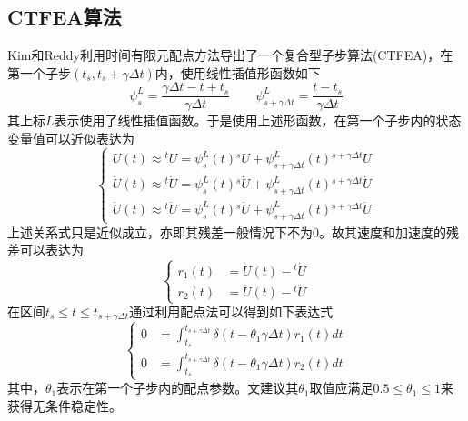 \subsection{CTFEA算法}
Kim和Reddy利用时间有限元配点方法导出了一个复合型子步算法(CTFEA)\cite{Kim2016}，在第一个子步$(t_s,t_s+\gamma\Delta t)$内，使用线性插值形函数如下
\begin{equation}
\psi_s^L=\frac{\gamma\Delta t-t+t_s}{\gamma\Delta t}\qquad \psi_{s+\gamma\Delta t}^L=\frac{t-t_s}{\gamma\Delta t}
\end{equation}
其上标$L$表示使用了线性插值函数。于是使用上述形函数，在第一个子步内的状态变量值可以近似表达为
\begin{equation}
\begin{cases}
U(t)\approx{^t\!U}=\psi_s^L(t){^s\!U}+\psi_{s+\gamma\Delta t}^L(t){^{s+\gamma\Delta t}\!U}\\
\dot{U}(t)\approx{^t\!\dot{U}}=\psi_s^L(t){^s\!\dot{U}}+\psi_{s+\gamma\Delta t}^L(t){^{s+\gamma\Delta t}\!\dot{U}}\\
\ddot{U}(t)\approx{^t\!\ddot{U}}=\psi_s^L(t){^s\!\ddot{U}}+\psi_{s+\gamma\Delta t}^L(t){^{s+\gamma\Delta t}\!\ddot{U}}
\end{cases}
\end{equation}
上述关系式只是近似成立，亦即其残差一般情况下不为0。故其速度和加速度的残差可以表达为
\begin{equation}
\begin{cases}
r_1(t)&=\dot{U}(t)-{^t\!\dot{U}}\\
r_2(t)&=\ddot{U}(t)-{^t\!\ddot{U}}
\end{cases}
\end{equation}
在区间$t_s\le t\le t_{s+\gamma\Delta t}$通过利用配点法可以得到如下表达式
\begin{equation}
\begin{cases}
0&=\int_{t_s}^{t_{s+\gamma\Delta t}}\delta(t-\theta_1\gamma\Delta t)r_1(t)dt\\
0&=\int_{t_s}^{t_{s+\gamma\Delta t}}\delta(t-\theta_1\gamma\Delta t)r_2(t)dt
\end{cases}
\end{equation}
其中，$\theta_1$表示在第一个子步内的配点参数。文建议其$\theta_1$取值应满足$0.5\le\theta_1\le1$来获得无条件稳定性。

